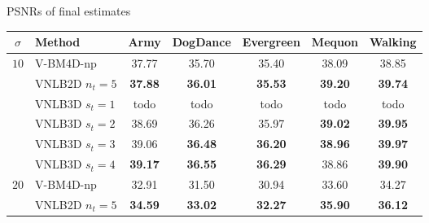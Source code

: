 \documentclass[mathserif, 8pt]{beamer}
\newcommand{\best}[1]{\textbf{\textcolor{MyOrange}{#1}}}
\newcommand{\Best}[1]{\textbf{\textcolor{MyOrangeBrighter}{#1}}}
\begin{document}
\begin{frame}{PSNRs of final estimates}


	\begin{center}
	{\tiny
	\renewcommand{\tabcolsep}{2mm}
	\renewcommand{\arraystretch}{1.0}
	\begin{tabular}{ c | l |c c c c c}
		\hline
		\rule{0pt}{6pt}$\sigma$ & Method        & Army & DogDance & Evergreen & Mequon & Walking  \\\hline
		\multirow{5}{*}{$10$} & V-BM4D-np        &       37.77  &       35.70  &       35.40  &       38.09  &       38.85  \\
		                      & VNLB2D $n_t = 5$ & \best{37.88} & \best{36.01} & \best{35.53} & \Best{39.20} & \best{39.74} \\
		                      & VNLB3D $s_t = 1$ &       todo   &       todo   &       todo   &       todo   &       todo   \\
		                      & VNLB3D $s_t = 2$ &       38.69  &       36.26  &       35.97  & \best{39.02} & \Best{39.95} \\
		                      & VNLB3D $s_t = 3$ &       39.06  & \Best{36.48} & \Best{36.20} & \best{38.96} & \Best{39.97} \\
		                      & VNLB3D $s_t = 4$ & \Best{39.17} & \Best{36.55} & \Best{36.29} &       38.86  & \Best{39.90} \\\hline
%
		\multirow{5}{*}{$20$} & V-BM4D-np        &       32.91  &       31.50  &       30.94  &       33.60  &       34.27  \\
		                      & VNLB2D $n_t = 5$ & \best{34.59} & \best{33.02} & \best{32.27} & \best{35.90} & \best{36.12} \\

\end{tabular}}
\end{center}
\end{frame}
\end{document}
